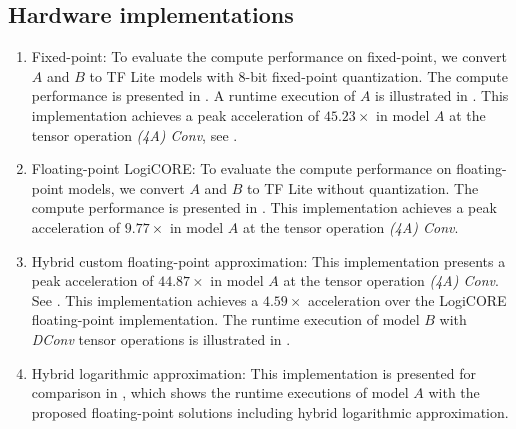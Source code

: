 \subsection{Hardware implementations}
\begin{enumerate}
\item{Fixed-point}: To evaluate the compute performance on fixed-point, we convert $A$ and $B$ to TF Lite models with 8-bit fixed-point quantization. The compute performance is presented in . A runtime execution of $A$ is illustrated in . This implementation achieves a peak acceleration of $45.23\times$ in model $A$ at the tensor operation \emph{(4A) Conv}, see .

\item{Floating-point LogiCORE}: To evaluate the compute performance on floating-point models, we convert $A$ and $B$ to TF Lite without quantization. The compute performance is presented in .
This implementation achieves a peak acceleration of $9.77\times$ in model $A$ at the tensor operation \emph{(4A) Conv}.

\item{Hybrid custom floating-point approximation}: This implementation presents a peak acceleration of $44.87\times$ in model $A$ at the tensor operation \emph{(4A) Conv}. See . This implementation achieves a $4.59\times$ acceleration over the LogiCORE floating-point implementation. The runtime execution of model $B$ with \emph{DConv} tensor operations is illustrated in .

\item{Hybrid logarithmic approximation}: This implementation is presented for comparison in , which shows the runtime executions of model $A$ with the proposed floating-point solutions including hybrid logarithmic approximation.
\end{enumerate}

